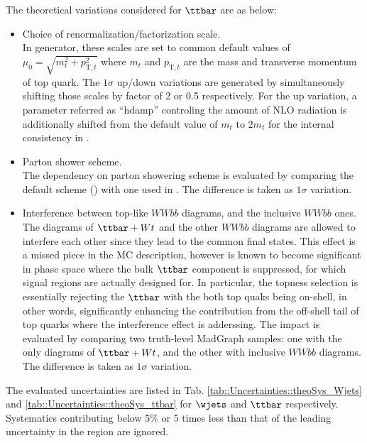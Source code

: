The theoretical variations considered for $\ttbar$ are as below:
\begin{itemize}
\item Choice of renormalization/factorization scale.\\
In \powhegbox generator, these scales are set to common default values of $\mu_0 = \sqrt{m_t^2+p_{\mathrm{T},t}^2}$ where $m_t$ and $p_{\mathrm{T},t}$ are the mass and transverse momentum of top quark.
The $1\sigma$ up/down variations are generated by simultaneously shifting those scales by factor of 2 or 0.5 respectively.  
For the up variation, a parameter referred as ``hdamp'' \cite{ttbarGen_ATLAS_Run1} controling the amount of NLO radiation is additionally shifted from the default value of $m_t$ to $2m_t$ for the internal consistency in \powhegbox. 

\item Parton shower scheme.\\
The dependency on parton showering scheme is evaluated by comparing the default scheme (\pythiasix) with one used in \herwig.
The difference is taken as $1\sigma$ variation.

\item Interference between top-like $WWbb$ diagrams, and the inclusive $WWbb$ ones.\\
The diagrams of $\ttbar+Wt$ and the other $WWbb$ diagrams are allowed to interfere each other since they lead to the common final states.
This effect is a missed piece in the MC description, however is known to become significant in phase space where the bulk $\ttbar$ component is suppressed, for which signal regions are actually designed for.
In particular, the topness selection is essentially rejecting the $\ttbar$ with the both top quaks being on-shell, in other words, significantly enhancing the contribution from the off-shell tail of top quarks where the interference effect is adderssing. The impact is evaluated by comparing two truth-level MadGraph samples: one with the only diagrams of $\ttbar+Wt$, and the other with inclusive $WWbb$ diagrams.
The difference is taken as $1\sigma$ variation.
\end{itemize}
The evaluated uncertainties are listed in Tab. \ref{tab::Uncertainties::theoSys_Wjets} and \ref{tab::Uncertainties::theoSys_ttbar} for $\wjets$ and $\ttbar$ respectively. Systematics contributing below 5$\%$ or 5 times less than that of the leading uncertainty in the region are ignored. \\

